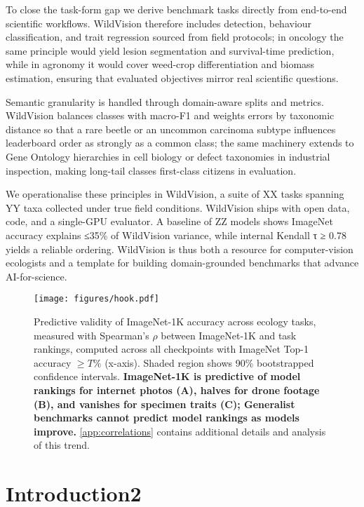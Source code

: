 \documentclass{article}
\begin{document}
To close the task-form gap we derive benchmark tasks directly from end-to-end scientific workflows. WildVision therefore includes detection, behaviour classification, and trait regression sourced from field protocols; in oncology the same principle would yield lesion segmentation and survival-time prediction, while in agronomy it would cover weed-crop differentiation and biomass estimation, ensuring that evaluated objectives mirror real scientific questions.

Semantic granularity is handled through domain-aware splits and metrics. WildVision balances classes with macro-F1 and weights errors by taxonomic distance so that a rare beetle or an uncommon carcinoma subtype influences leaderboard order as strongly as a common class; the same machinery extends to Gene Ontology hierarchies in cell biology or defect taxonomies in industrial inspection, making long-tail classes first-class citizens in evaluation.

We operationalise these principles in WildVision, a suite of XX tasks spanning YY taxa collected under true field conditions. WildVision ships with open data, code, and a single-GPU evaluator. A baseline of ZZ models shows ImageNet accuracy explains ≤35\% of WildVision variance, while internal Kendall τ ≥ 0.78 yields a reliable ordering.
WildVision is thus both a resource for computer-vision ecologists and a template for building domain-grounded benchmarks that advance AI-for-science.

\begin{figure}[t]
    \centering
    \texttt{[image: figures/hook.pdf]}
    \caption{
    Predictive validity of ImageNet-1K accuracy across ecology tasks, measured with Spearman's $\rho$ between ImageNet-1K and task rankings, computed across all checkpoints with ImageNet Top-1 accuracy $\geq T\%$ (x-axis). 
    Shaded region shows \num{90}\% bootstrapped confidence intervals. 
    \textbf{ImageNet-1K is predictive of model rankings for internet photos (A), halves for drone footage (B), and vanishes for specimen traits (C); Generalist benchmarks cannot predict model rankings as models improve.} 
    \cref{app:correlations} contains additional details and analysis of this trend.
    }\label{fig:hook}
\end{figure}


\section{Introduction2}
\end{document}
